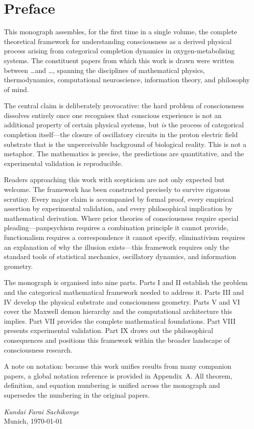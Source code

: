 \chapter*{Preface}

This monograph assembles, for the first time in a single volume, the complete theoretical framework for understanding consciousness as a derived physical process arising from categorical completion dynamics in oxygen-metabolising systems. The constituent papers from which this work is drawn were written between \ldots and \ldots, spanning the disciplines of mathematical physics, thermodynamics, computational neuroscience, information theory, and philosophy of mind.

The central claim is deliberately provocative: the hard problem of consciousness dissolves entirely once one recognises that conscious experience is not an additional property of certain physical systems, but \emph{is} the process of categorical completion itself---the closure of oscillatory circuits in the proton electric field substrate that is the unperceivable background of biological reality. This is not a metaphor. The mathematics is precise, the predictions are quantitative, and the experimental validation is reproducible.

Readers approaching this work with scepticism are not only expected but welcome. The framework has been constructed precisely to survive rigorous scrutiny. Every major claim is accompanied by formal proof, every empirical assertion by experimental validation, and every philosophical implication by mathematical derivation. Where prior theories of consciousness require special pleading---panpsychism requires a combination principle it cannot provide, functionalism requires a correspondence it cannot specify, eliminativism requires an explanation of why the illusion exists---this framework requires only the standard tools of statistical mechanics, oscillatory dynamics, and information geometry.

The monograph is organised into nine parts. Parts I and II establish the problem and the categorical mathematical framework needed to address it. Parts III and IV develop the physical substrate and consciousness geometry. Parts V and VI cover the Maxwell demon hierarchy and the computational architecture this implies. Part VII provides the complete mathematical foundations. Part VIII presents experimental validation. Part IX draws out the philosophical consequences and positions this framework within the broader landscape of consciousness research.

A note on notation: because this work unifies results from many companion papers, a global notation reference is provided in Appendix~A. All theorem, definition, and equation numbering is unified across the monograph and supersedes the numbering in the original papers.

\vspace{2em}
\noindent
\begin{flushright}
\textit{Kundai Farai Sachikonye}\\
Munich, \today
\end{flushright}
